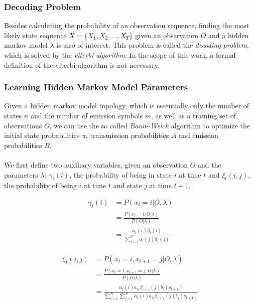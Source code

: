 \subsubsection{Decoding Problem}
Besides calculating the probability of an observation sequence, finding the most likely state sequence $X = \{X_1, X_2, \dots, X_T\}$ given an observation $O$ and a hidden markov model $\lambda$ is also of interest. 
This problem is called the \textit{decoding problem}, which is solved by the \textit{viterbi algorithm}. In the scope of this work, a formal definition of the viterbi algorithm is not necessary. 

\subsubsection{Learning Hidden Markov Model Parameters}
\label{sec:learning_hmm}
Given a hidden markov model topology, which is essentially only the number of states $n$ and the number of emission symbols $m$, as well as a training set of observations $O$, we can use the so called \textit{Baum-Welch} algorithm to optimize the initial state probabilities $\pi$, transmission probabilities $A$ and emission probabilities $B$. \\ \\
We first define two auxiliary variables, given an observation $O$ and the parameters $\lambda$: $\gamma_t(i)$, the probability of being in state $i$ at time $t$ and $\xi_t(i, j)$, the probability of being $i$ at time $t$ and state $j$ at time $t + 1$.

\begin{minipage}{0.45\textwidth}
\begin{align*}
\gamma_t(i) &= P(x_t = i|O,\lambda) \\
&= \frac{P(x_t = i, O|\lambda)}{P(O|\lambda)} \\
&=\frac{\alpha_t(i)\beta_t(i)}{\sum_{j = 1}^{N} \alpha_t(j) \beta_t(j)} 
\end{align*}
\end{minipage}
\hfill
\begin{minipage}{0.45\textwidth}
\begin{align*}
\xi_t(i, j) &= P(x_t = i,x_{t + 1} = j|O,\lambda) \\
&= \frac{P(x_t = i,x_{t + 1} = j, O|\lambda)}{P(O|\lambda)} \\
&=\frac{\alpha_t(i)a_{ij}\beta_{t + 1}(j)b_j(o_{t + 1})}{\sum_{i = 1}^{N} \sum_{j = 1}^{N} \alpha_t(i)a_{ij}\beta_{t + 1}(j)b_j(o_{t + 1})}
\end{align*}
\end{minipage}

